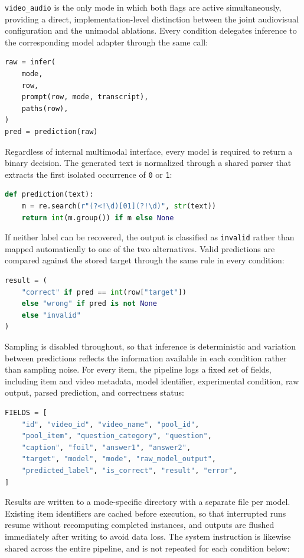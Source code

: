 \texttt{video\_audio} is the only mode in which both flags are active simultaneously, providing a direct, implementation-level distinction between the joint audiovisual configuration and the unimodal ablations.
Every condition delegates inference to the corresponding model adapter through the same call:
\begin{lstlisting}[language=Python]
raw = infer(
    mode,
    row,
    prompt(row, mode, transcript),
    paths(row),
)
pred = prediction(raw)
\end{lstlisting}
Regardless of internal multimodal interface, every model is required to return a binary decision. The generated text is normalized through a shared parser that extracts the first isolated occurrence of \texttt{0} or \texttt{1}:
\begin{lstlisting}[language=Python]
def prediction(text):
    m = re.search(r"(?<!\d)[01](?!\d)", str(text))
    return int(m.group()) if m else None
\end{lstlisting}
If neither label can be recovered, the output is classified as \texttt{invalid} rather than mapped automatically to one of the two alternatives. Valid predictions are compared against the stored target through the same rule in every condition:
\begin{lstlisting}[language=Python]
result = (
    "correct" if pred == int(row["target"])
    else "wrong" if pred is not None
    else "invalid"
)
\end{lstlisting}
Sampling is disabled throughout, so that inference is deterministic and variation between predictions reflects the information available in each condition rather than sampling noise. For every item, the pipeline logs a fixed set of fields, including item and video metadata, model identifier, experimental condition, raw output, parsed prediction, and correctness status:
\begin{lstlisting}[language=Python]
FIELDS = [
    "id", "video_id", "video_name", "pool_id",
    "pool_item", "question_category", "question",
    "caption", "foil", "answer1", "answer2",
    "target", "model", "mode", "raw_model_output",
    "predicted_label", "is_correct", "result", "error",
]
\end{lstlisting}
Results are written to a mode-specific directory with a separate file per model. Existing item identifiers are cached before execution, so that interrupted runs resume without recomputing completed instances, and outputs are flushed immediately after writing to avoid data loss.
The system instruction is likewise shared across the entire pipeline, and is not repeated for each condition below:
